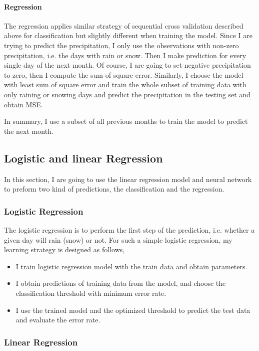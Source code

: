 \documentclass[a4paper,11pt]{article}
\begin{document}
\paragraph{Regression} The regression applies similar strategy of sequential cross validation described above for classification but slightly different when training the model. Since I are trying to predict the precipitation, I only use the observations with non-zero precipitation, i.e. the days with rain or snow. Then I make prediction for every single day of the next month. Of course, I are going to set negative precipitation to zero, then I compute the sum of square error. Similarly, I choose the model with least sum of square error and train the whole subset of training data with only raining or snowing days and predict the precipitation in the testing set and obtain MSE.

In summary, I use a subset of all previous months to train the model to predict the next month.

\subsection{Logistic and linear Regression}

In this section, I are going to use the linear regression model and  neural network to preform two kind of predictions, the classification and the regression.\par

\subsubsection{Logistic Regression}

The logistic regression is to perform the first step of the prediction, i.e. whether a given day will rain (snow) or not. For such a simple logistic regression, my learning strategy is designed as follows,
\begin{itemize}
	\item I train logistic regression model with the train data and obtain parameters.
	\item I obtain predictions of training data from the model, and choose the classification threshold with minimum error rate.
	\item I use the trained model and the optimized threshold to predict the test data and evaluate the error rate.
\end{itemize}


\subsubsection{Linear Regression}
\end{document}
